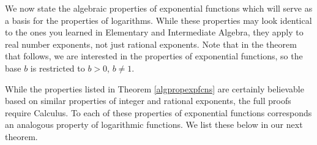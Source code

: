 \smallskip

We now state the algebraic properties of exponential functions which will serve as a basis for the properties of logarithms.  While these properties may look identical to the ones you learned in Elementary and Intermediate Algebra, they apply to real number exponents, not just rational exponents.  Note that in the theorem that follows, we are interested in the properties of exponential functions, so the base $b$ is restricted to $b > 0$, $b \neq 1$.  %

\smallskip


\smallskip

While the properties listed in Theorem \ref{algpropexpfcns} are certainly believable based on similar properties of integer and rational exponents, the full proofs require Calculus.  To each of these properties of exponential functions corresponds an analogous property of logarithmic functions.  We list these below in our next theorem.

\smallskip

